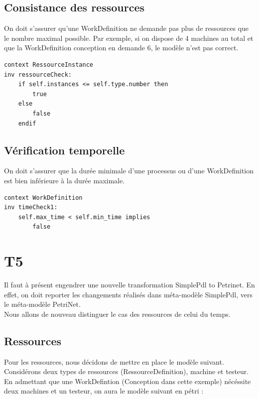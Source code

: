 \documentclass{report}
\begin{document}
\subsection{Consistance des ressources}

On doit s'assurer qu'une WorkDefinition ne demande pas plus de ressources que le nombre maximal possible.
Par exemple, si on dispose de 4 machines au total et que la WorkDefinition conception en demande 6, le modèle n'est pas correct.

\begin{verbatim}
context RessourceInstance
inv ressourceCheck:
	if self.instances <= self.type.number then
		true
	else
		false
	endif
\end{verbatim}

\subsection{Vérification temporelle}

On doit s'assurer que la durée minimale d'une processus ou d'une WorkDefinition est bien inférieure à la durée maximale.

\begin{verbatim}
context WorkDefinition
inv timeCheck1:
	self.max_time < self.min_time implies
		false
\end{verbatim}

\section{T5}

Il faut à présent engendrer une nouvelle transformation SimplePdl to Petrinet. En effet, on doit reporter les changements réalisés dans méta-modèle SimplePdl, vers le méta-modèle PetriNet.\\

Nous allons de nouveau distinguer le cas des ressources de celui du temps.

\subsection{Ressources}

Pour les ressources, nous décidons de mettre en place le modèle suivant. Considérons deux types de ressources (RessourceDefinition), machine et testeur.
En admettant que une WorkDefintion (Conception dans cette exemple) nécéssite deux machines et un testeur, on aura le modèle suivant en pétri :\\
\end{document}
